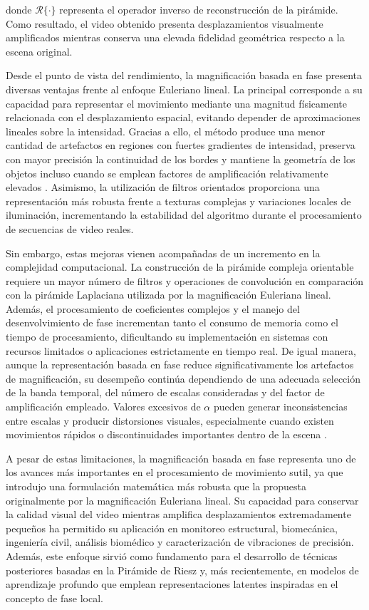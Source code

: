 donde $\mathcal{R}\{\cdot\}$ representa el operador inverso de reconstrucción de la pirámide. Como resultado, el video obtenido presenta desplazamientos visualmente amplificados mientras conserva una elevada fidelidad geométrica respecto a la escena original.

Desde el punto de vista del rendimiento, la magnificación basada en fase presenta diversas ventajas frente al enfoque Euleriano lineal. La principal corresponde a su capacidad para representar el movimiento mediante una magnitud físicamente relacionada con el desplazamiento espacial, evitando depender de aproximaciones lineales sobre la intensidad. Gracias a ello, el método produce una menor cantidad de artefactos en regiones con fuertes gradientes de intensidad, preserva con mayor precisión la continuidad de los bordes y mantiene la geometría de los objetos incluso cuando se emplean factores de amplificación relativamente elevados \cite{wadhwa2013phase}. Asimismo, la utilización de filtros orientados proporciona una representación más robusta frente a texturas complejas y variaciones locales de iluminación, incrementando la estabilidad del algoritmo durante el procesamiento de secuencias de video reales.

Sin embargo, estas mejoras vienen acompañadas de un incremento en la complejidad computacional. La construcción de la pirámide compleja orientable requiere un mayor número de filtros y operaciones de convolución en comparación con la pirámide Laplaciana utilizada por la magnificación Euleriana lineal. Además, el procesamiento de coeficientes complejos y el manejo del desenvolvimiento de fase incrementan tanto el consumo de memoria como el tiempo de procesamiento, dificultando su implementación en sistemas con recursos limitados o aplicaciones estrictamente en tiempo real. De igual manera, aunque la representación basada en fase reduce significativamente los artefactos de magnificación, su desempeño continúa dependiendo de una adecuada selección de la banda temporal, del número de escalas consideradas y del factor de amplificación empleado. Valores excesivos de $\alpha$ pueden generar inconsistencias entre escalas y producir distorsiones visuales, especialmente cuando existen movimientos rápidos o discontinuidades importantes dentro de la escena \cite{ahmed2023overview}.

A pesar de estas limitaciones, la magnificación basada en fase representa uno de los avances más importantes en el procesamiento de movimiento sutil, ya que introdujo una formulación matemática más robusta que la propuesta originalmente por la magnificación Euleriana lineal. Su capacidad para conservar la calidad visual del video mientras amplifica desplazamientos extremadamente pequeños ha permitido su aplicación en monitoreo estructural, biomecánica, ingeniería civil, análisis biomédico y caracterización de vibraciones de precisión. Además, este enfoque sirvió como fundamento para el desarrollo de técnicas posteriores basadas en la Pirámide de Riesz y, más recientemente, en modelos de aprendizaje profundo que emplean representaciones latentes inspiradas en el concepto de fase local.

